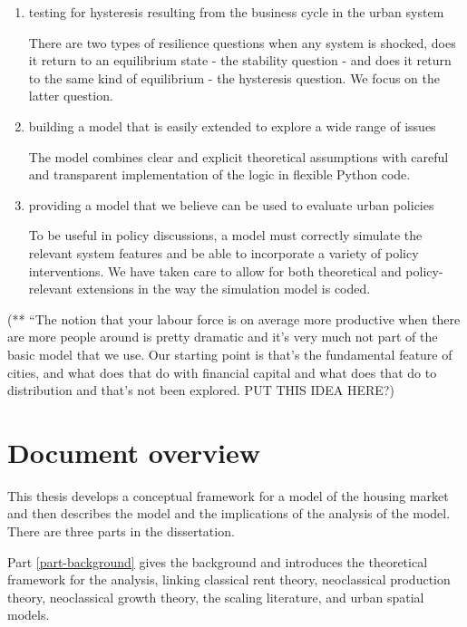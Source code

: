\begin{enumerate}
    \item testing for hysteresis resulting from the business cycle   in the urban system 

There are two types of resilience questions when any system is shocked, does it return to an equilibrium state - the stability question - and does it return to the same kind of equilibrium - the hysteresis question. We focus on the latter question.  

    \item building a model that is easily extended to explore a wide range of issues

The model combines clear and explicit theoretical assumptions with careful and transparent implementation of the logic in flexible Python code.

    \item providing a model that we believe can be used  to evaluate urban policies

To be useful in policy discussions, a model must correctly simulate the relevant system features and be able to incorporate a variety of policy interventions. We have taken care to allow for  both theoretical and policy- relevant extensions in the way the simulation model is coded. 
\end{enumerate}

(** ``The notion that your labour force is on average more productive when there are more people around is pretty dramatic and it's very much not part of the basic model that we use. Our starting point is that's the fundamental feature of cities, and what does that do with financial capital and what does that do to distribution and that's not been explored. PUT THIS IDEA HERE?)

\section{Document overview}
This thesis develops a conceptual framework for a model of the housing market and then describes the model and the implications of the analysis of the model. %
There are three parts in the dissertation. 

Part \ref{part-background} gives the background and introduces the theoretical framework for the analysis,  linking classical rent theory, neoclassical production theory, neoclassical growth theory, the scaling literature, and urban spatial models. 

